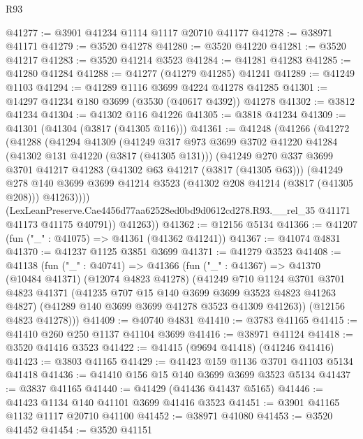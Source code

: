 \begin{lexlean}{R93}
\begin{coremodule}
@41277 := @3901 @41234 @1114 @1117 @20710 @41177
@41278 := @38971 @41171
@41279 := @3520 @41278
@41280 := @3520 @41220
@41281 := @3520 @41217
@41283 := @3520 @41214 @3523
@41284 := @41281 @41283
@41285 := @41280 @41284
@41288 := @41277 (@41279 @41285) @41241
@41289 := @41249 @1103
@41294 := @41289 @1116 @3699 @4224 @41278 @41285
@41301 := @14297 @41234 @180 @3699 (@3530 (@40617 @4392)) @41278
@41302 := @3812 @41234
@41304 := @41302 @116 @41226
@41305 := @3818 @41234
@41309 := @41301 (@41304 (@3817 (@41305 @116)))
@41361 := @41248
    (@41266
      (@41272
        (@41288
          (@41294
            @41309
            (@41249
              @317
              @973
              @3699
              @3702
              @41220
              @41284
              (@41302 @131 @41220 (@3817 (@41305 @131)))
              (@41249
                @270
                @337
                @3699
                @3701
                @41217
                @41283
                (@41302 @63 @41217 (@3817 (@41305 @63)))
                (@41249
                  @278
                  @140
                  @3699
                  @3699
                  @41214
                  @3523
                  (@41302 @208 @41214 (@3817 (@41305 @208)))
                  @41263))))
          (LexLeanPreserve.Cae4456d77aa62528ed0bd9d0612cd278.R93.__rel_35
            @41171
            @41173
            @41175
            @40791))
        @41263))
@41362 := @12156 @5134
@41366 := @41207 (fun ("_" : @41075) => @41361 (@41362 @41241))
@41367 := @41074 @4831
@41370 := @41237 @1125 @3851 @3699
@41371 := @41279 @3523
@41408 := @41138
    (fun ("_" : @40741) =>
    @41366
      (fun ("_" : @41367) =>
      @41370
        (@10484 @41371)
        (@12074 @4823 @41278)
        (@41249
          @710
          @1124
          @3701
          @3701
          @4823
          @41371
          (@41235 @707 @15 @140 @3699 @3699 @3523 @4823 @41263 @4827)
          (@41289 @140 @3699 @3699 @41278 @3523 @41309 @41263))
        (@12156 @4823 @41278)))
@41409 := @40740 @4831
@41410 := @3783 @41165
@41415 := @41410 @260 @250 @1137 @41104 @3699
@41416 := @38971 @41124
@41418 := @3520 @41416 @3523
@41422 := @41415 (@9694 @41418) (@41246 @41416)
@41423 := @3803 @41165
@41429 := @41423 @159 @1136 @3701 @41103 @5134 @41418
@41436 := @41410 @156 @15 @140 @3699 @3699 @3523 @5134
@41437 := @3837 @41165
@41440 := @41429 (@41436 @41437 @5165)
@41446 := @41423 @1134 @140 @41101 @3699 @41416 @3523
@41451 := @3901 @41165 @1132 @1117 @20710 @41100
@41452 := @38971 @41080
@41453 := @3520 @41452
@41454 := @3520 @41151

\end{coremodule}
\end{lexlean}
